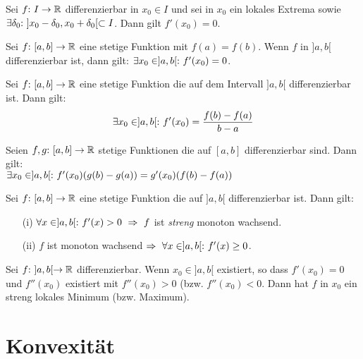 \begin{framedthm}
	Sei $f{:}\  I \to \mathbb{R}$ differenzierbar in $x_0 \in I$ und sei in $x_0$ ein lokales Extrema sowie $\exists \delta_0 {:}\  ]x_0 - \delta_0, x_0 + \delta_0[ \subset I$. Dann gilt $f'(x_0) = 0$.
\end{framedthm}

\begin{framedthm}
	Sei $f{:}\  [a,b] \to \mathbb{R}$ eine stetige Funktion mit $f(a)=f(b)$. Wenn $f$ in $]a,b[$ differenzierbar ist, dann gilt: $\exists x_0 \in ]a,b[{:}\  f'(x_0) = 0$.
\end{framedthm}

\begin{framedthm}
	Sei $f{:}\  [a,b] \to \mathbb{R}$ eine stetige Funktion die auf dem Intervall $]a,b[$ differenzierbar ist. Dann gilt: \[
	\exists x_0 \in ]a,b[{:}\  f'(x_0) = \frac{f(b) - f(a)}{b-a}
	\]
\end{framedthm}

\begin{framedthm}
	Seien $f,g{:}\  [a,b] \to \mathbb{R}$ stetige Funktionen die auf $[a,b]$ differenzierbar sind. Dann gilt:\\
	$\exists x_0 \in ]a,b[{:}\  f'(x_0) (g(b)-g(a)) = g'(x_0) (f(b)-f(a))$
\end{framedthm}

\begin{framedthm}
	Sei $f{:}\  [a,b] \to \mathbb{R}$ eine stetige Funktion die auf $]a,b[$ differenzierbar ist. Dann gilt:
	\begin{enumerate}
		\item [(i)] $\forall x \in ]a,b[\st f'(x) > 0 \ \Rightarrow \ f$ ist \textit{streng} monoton wachsend. 
		\item [(ii)] $f$ ist monoton wachsend $\Rightarrow \ \forall x \in ]a,b[ {:}\  f'(x) \geq 0$.
	\end{enumerate}
\end{framedthm}

\begin{framedthm}
	Sei $f{:}\ ]a,b[ \to \mathbb{R}$ differenzierbar. Wenn $x_0 \in ]a,b[$ existiert, so dass $f'(x_0) = 0$ und $f''(x_0)$ existiert mit $f''(x_0) > 0$ (bzw. $f''(x_0) < 0$. Dann hat $f$ in $x_0$ ein streng lokales Minimum (bzw. Maximum).
\end{framedthm}

\section{Konvexität}

